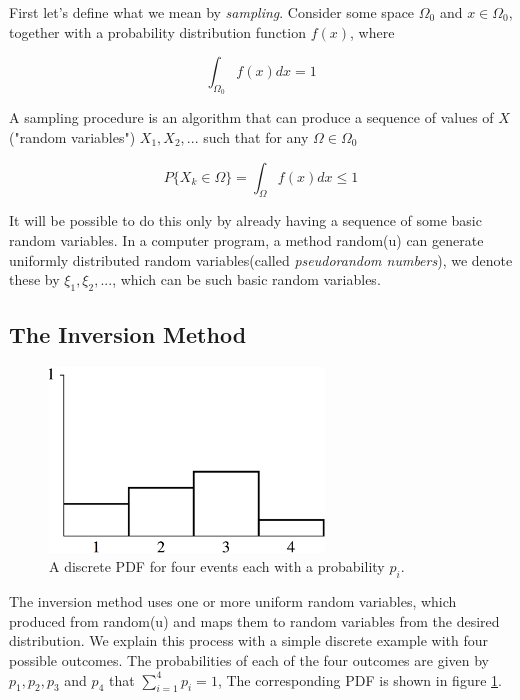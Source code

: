 First let's define what we mean by \textit{sampling}. Consider some space $\Omega_0$ and $x\in\Omega_0$, together with a probability distribution function $f(x)$, where

\begin{equation}
	\int_{\Omega_0}f(x)dx=1
\end{equation}

A sampling procedure is an algorithm that can produce a sequence of values of $X$ ("random variables") $X_1,X_2,...$ such that for any $\Omega\in\Omega_0$

\begin{equation}
	P\{X_k\in\Omega\}=\int_{\Omega}f(x)dx\leq 1
\end{equation}

It will be possible to do this only by already having a sequence of some basic random variables. In a computer program, a method random(u) can generate  uniformly distributed random variables(called \textit{pseudorandom numbers}), we denote these by $\xi_1,\xi_2,...$, which can be such basic random variables.



\subsection{The Inversion Method}
\begin{figure}
\sidecaption
	\includegraphics[width=0.65\textwidth]{graphics/gi/mc-3}
	\caption{A discrete PDF for four events each with a probability $p_i$.}
	\label{f:simple-pdf}
\end{figure}

The inversion method uses one or more uniform random variables, which produced from random(u) and maps them to random variables from the desired distribution. We explain this process with a simple discrete example with four possible outcomes. The probabilities of each of the four outcomes are given by $p_1,p_2,p_3$ and $p_4$ that $\sum_{i=1}^{4}p_i=1$, The corresponding PDF is shown in figure \ref{f:simple-pdf}.

